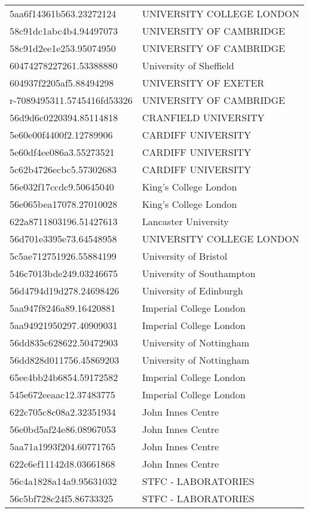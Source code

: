 \begin{tabular}{ll}
5aa6f14361b563.23272124 & UNIVERSITY COLLEGE LONDON \\
58c91dc1abc4b4.94497073 & UNIVERSITY OF CAMBRIDGE \\
58c91d2ee1e253.95074950 & UNIVERSITY OF CAMBRIDGE \\
60474278227261.53388880 & University of Sheffield \\
604937f2205af5.88494298 & UNIVERSITY OF EXETER \\
r-7089495311.5745416fd53326 & UNIVERSITY OF CAMBRIDGE \\
56d9d6c0220394.85114818 & CRANFIELD UNIVERSITY \\
5e60e00f4400f2.12789906 & CARDIFF UNIVERSITY \\
5e60df4ee086a3.55273521 & CARDIFF UNIVERSITY \\
5c62b4726ecbc5.57302683 & CARDIFF UNIVERSITY \\
56e032f17ccdc9.50645040 & King's College London \\
56e065bea17078.27010028 & King's College London \\
622a8711803196.51427613 & Lancaster University \\
56d701e3395e73.64548958 & UNIVERSITY COLLEGE LONDON \\
5c5ae712751926.55884199 & University of Bristol \\
546c7013bde249.03246675 & University of Southampton \\
56d4794d19d278.24698426 & University of Edinburgh \\
5aa947f8246a89.16420881 & Imperial College London \\
5aa94921950297.40909031 & Imperial College London \\
56dd835c628622.50472903 & University of Nottingham \\
56dd828d011756.45869203 & University of Nottingham \\
65ee4bb24b6854.59172582 & Imperial College London \\
545e672eeaac12.37483775 & Imperial College London \\
622c705c8c08a2.32351934 & John Innes Centre \\
56e0bd5af24e86.08967053 & John Innes Centre \\
5aa71a1993f204.60771765 & John Innes Centre \\
622c6ef11142d8.03661868 & John Innes Centre \\
56c4a1828a14a9.95631032 & STFC - LABORATORIES \\
56c5bf728c24f5.86733325 & STFC - LABORATORIES \\

\end{tabular}
